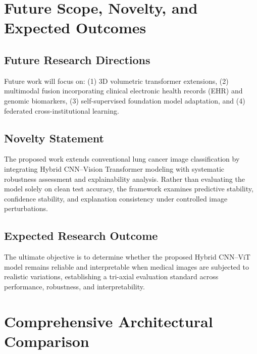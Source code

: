 \documentclass[conference]{IEEEtran}
\begin{document}
\section{Future Scope, Novelty, and Expected Outcomes}
\label{sec:future_novelty}

\subsection{Future Research Directions}
Future work will focus on: (1) 3D volumetric transformer extensions, (2) multimodal fusion incorporating clinical electronic health records (EHR) and genomic biomarkers, (3) self-supervised foundation model adaptation, and (4) federated cross-institutional learning.

\subsection{Novelty Statement}
The proposed work extends conventional lung cancer image classification by integrating Hybrid CNN--Vision Transformer modeling with systematic robustness assessment and explainability analysis. Rather than evaluating the model solely on clean test accuracy, the framework examines predictive stability, confidence stability, and explanation consistency under controlled image perturbations.

\subsection{Expected Research Outcome}
The ultimate objective is to determine whether the proposed Hybrid CNN--ViT model remains reliable and interpretable when medical images are subjected to realistic variations, establishing a tri-axial evaluation standard across performance, robustness, and interpretability.

\section{Comprehensive Architectural Comparison}
\label{sec:comparison_table}
\end{document}
